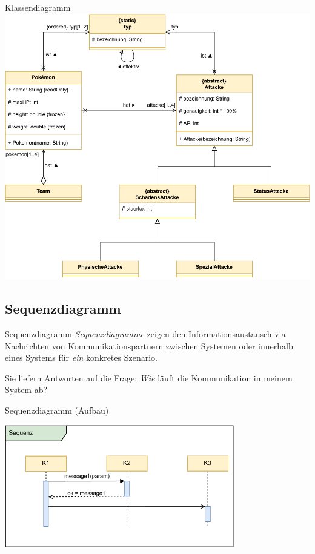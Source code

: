 \begin{example}{Klassendiagramm}
    \includegraphics[width=\textwidth]{includes/figures/example_diagrams_class.pdf}
\end{example}

\subsection{Sequenzdiagramm}

\begin{defi}{Sequenzdiagramm}
    \emph{Sequenzdiagramme} zeigen den Informationsaustausch via Nachrichten von Kommunikationspartnern zwischen Systemen oder innerhalb eines Systems für \emph{ein} konkretes Szenario.

    Sie liefern Antworten auf die Frage:
    \emph{Wie} läuft die Kommunikation in meinem System ab?
\end{defi}

\begin{diag}{Sequenzdiagramm (Aufbau)}
    \begin{center}
        \includegraphics[width=0.75\textwidth]{includes/figures/defi_diagrams_sequenz_intro.pdf}
    \end{center}
\end{diag}

